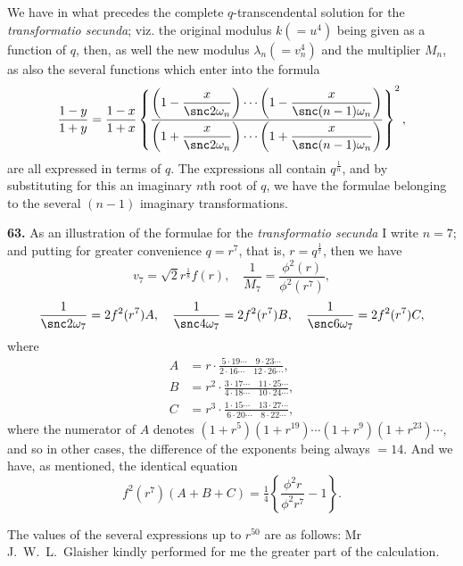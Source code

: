 \documentclass[11pt,a4paper]{book}
\begin{document}
We have in what precedes the complete $q$-transcendental solution for the \textit{transformatio secunda}; viz. the original modulus $k(= u^4)$ being given as a function of $q$, then, as well the new modulus $\lambda_n (= v_n^4)$ and the multiplier $M_n$, as also the several functions which enter into the formula
\[
\frac{1 - y}{1 + y} = \frac{1 - x}{1 + x}
\left\{
\frac{\left(1 - \dfrac{x}{\snc 2\omega_n}\right) \cdots
\left(1 - \dfrac{x}{\snc (n-1)\omega_n}\right)}
{\left(1 + \dfrac{x}{\snc 2\omega_n}\right) \cdots
\left(1 + \dfrac{x}{\snc (n-1)\omega_n}\right)}
\right\}^2,
\]
are all expressed in terms of $q$. The expressions all contain $q^{\frac{1}{n}}$, and by substituting for this an imaginary $n$th root of $q$, we have the formulae belonging to the several $(n-1)$ imaginary transformations.

\textbf{63.} As an illustration of the formulae for the \textit{transformatio secunda} I write $n = 7$; and putting for greater convenience $q = r^7$, that is, $r = q^{\frac{1}{7}}$, then we have
\[
v_7 = \sqrt{2} r^{\frac{1}{8}} f(r), \quad
\frac{1}{M_7} = \frac{\phi^2(r)}{\phi^2(r^7)},
\]
\[
\frac{1}{\snc 2\omega_7} = 2f^2(r^7)A, \quad
\frac{1}{\snc 4\omega_7} = 2f^2(r^7)B, \quad
\frac{1}{\snc 6\omega_7} = 2f^2(r^7)C,
\]
where
\begin{align*}
A &= r \cdot \frac{5 \cdot 19 \cdots \quad 9 \cdot 23 \cdots}{2 \cdot 16 \cdots \quad 12 \cdot 26 \cdots}, \\
B &= r^2 \cdot \frac{3 \cdot 17 \cdots \quad 11 \cdot 25 \cdots}{4 \cdot 18 \cdots \quad 10 \cdot 24 \cdots}, \\
C &= r^3 \cdot \frac{1 \cdot 15 \cdots \quad 13 \cdot 27 \cdots}{6 \cdot 20 \cdots \quad 8 \cdot 22 \cdots},
\end{align*}
where the numerator of $A$ denotes $(1 + r^5)(1 + r^{19}) \cdots (1 + r^9)(1 + r^{23}) \cdots$, and so in other cases, the difference of the exponents being always $= 14$. And we have, as mentioned, the identical equation
\[
f^2(r^7)(A + B + C) = \tfrac{1}{4}\left\{\frac{\phi^2 r}{\phi^2 r^7} - 1\right\}.
\]

The values of the several expressions up to $r^{50}$ are as follows: Mr J.~W.~L.~Glaisher kindly performed for me the greater part of the calculation.
\end{document}
